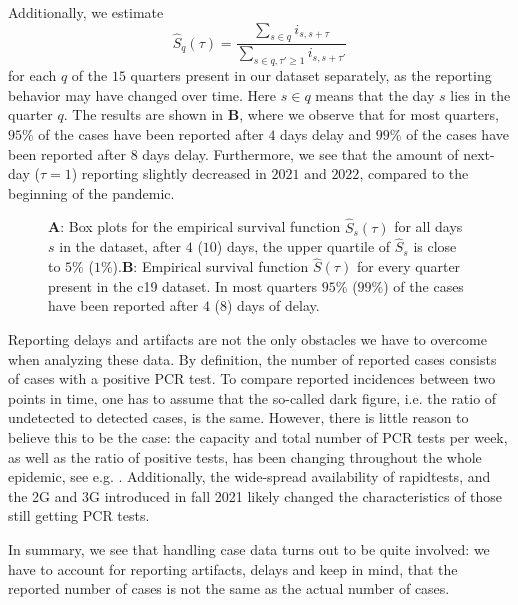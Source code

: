 Additionally, we estimate 
$$
    \hat S_{q}(\tau) = \frac{\sum_{s \in q} i_{s,s + \tau}}{\sum_{s \in q, \tau' \geq 1} i_{s, s+ \tau'}}
$$
for each $q$ of the $15$ quarters present in our dataset separately, as the reporting behavior may have changed over time. Here $s\in q$ means that the day $s$ lies in the quarter $q$. The results are shown in  \textbf{B}, where we observe that for most quarters, $95\%$ of the cases have been reported after $4$ days delay and $99\%$ of the cases have been reported after $8$ days delay. 
Furthermore, we see that the amount of next-day ($\tau = 1$) reporting slightly decreased in $2021$ and $2022$, compared to the beginning of the pandemic.

\begin{figure}
    \resizebox{\textwidth}{!}{%
    }
    \caption{\textbf{A}: Box plots for the empirical survival function $\hat S_{s}(\tau)$ for all days $s$ in the dataset, after $4$ ($10$) days, the upper quartile of $\hat S_{s}$ is close to $5\%$ ($1\%$).\textbf{B}: Empirical survival function $\hat S(\tau)$ for every quarter present in the \acrshort{c19} dataset. In most quarters $95\%$ ($99\%$) of the cases have been reported after $4$ ($8$) days of delay.}
    \label{fig:survival_function_rep_tri_incidences}
\end{figure}

Reporting delays and artifacts are not the only obstacles we have to overcome when analyzing these data. By definition, the number of reported cases consists of cases with a positive PCR test. To compare reported incidences between two points in time, one has to assume that the so-called dark figure, i.e. the ratio of undetected to detected cases, is the same. However, there is little reason to believe this to be the case: the capacity and total number of PCR tests per week, as well as the ratio of positive tests, has been changing throughout the whole epidemic, see e.g. \citep{Willrich2021Update}. Additionally, the wide-spread availability of rapidtests, and the 2G and 3G  introduced in fall 2021 likely changed the characteristics of those still getting PCR tests.

In summary, we see that handling case data turns out to be quite involved: we have to account for reporting artifacts, delays and keep in mind, that the reported number of cases is not the same as the actual number of cases. 

